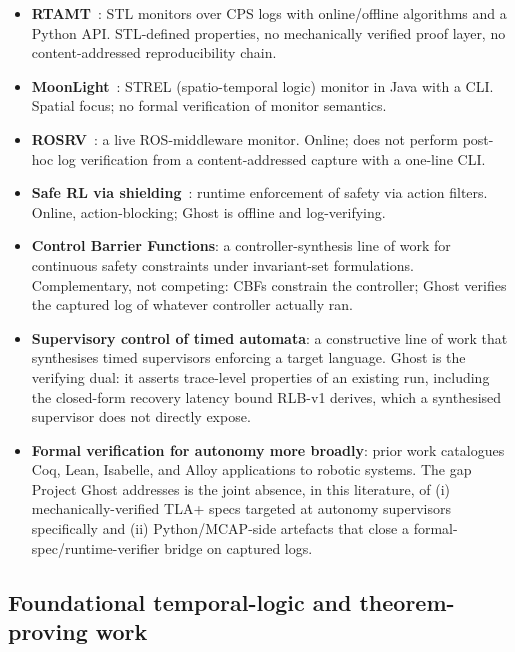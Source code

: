 \documentclass[11pt,a4paper]{article}
\begin{document}
\begin{itemize}
  \item \textbf{RTAMT}~\cite{nikovic2020rtamt,nikovic2023rtamt}: STL
        monitors over CPS logs with online/offline algorithms and a
        Python API. STL-defined properties, no mechanically verified
        proof layer, no content-addressed reproducibility chain.
  \item
        \textbf{MoonLight}~\cite{bartocci2020moonlight,bartocci2023moonlight}:
        STREL (spatio-temporal logic) monitor in Java with a CLI.
        Spatial focus; no formal verification of monitor semantics.
  \item \textbf{ROSRV}~\cite{huang2014rosrv}: a live ROS-middleware
        monitor. Online; does not perform post-hoc log verification
        from a content-addressed capture with a one-line CLI.
  \item \textbf{Safe RL via
        shielding}~\cite{alshiekh2018safe,carr2023safe}:
        runtime enforcement of safety via action filters. Online,
        action-blocking; Ghost is offline and log-verifying.
  \item \textbf{Control Barrier Functions}: a controller-synthesis
        line of work for continuous safety constraints under
        invariant-set formulations. Complementary, not competing:
        CBFs constrain the controller; Ghost verifies the captured
        log of whatever controller actually ran.
  \item \textbf{Supervisory control of timed automata}: a
        constructive line of work that synthesises timed
        supervisors enforcing a target language. Ghost is the
        verifying dual: it asserts trace-level properties of an
        existing run, including the closed-form recovery latency
        bound RLB-v1 derives, which a synthesised supervisor does
        not directly expose.
  \item \textbf{Formal verification for autonomy more broadly}:
        prior work catalogues Coq, Lean, Isabelle, and Alloy
        applications to robotic systems. The gap Project Ghost
        addresses is the joint absence, in this literature, of
        (i) mechanically-verified TLA+ specs targeted at autonomy
        supervisors specifically and (ii) Python/MCAP-side
        artefacts that close a formal-spec/runtime-verifier bridge
        on captured logs.
\end{itemize}

\subsection{Foundational temporal-logic and theorem-proving work}
\end{document}
